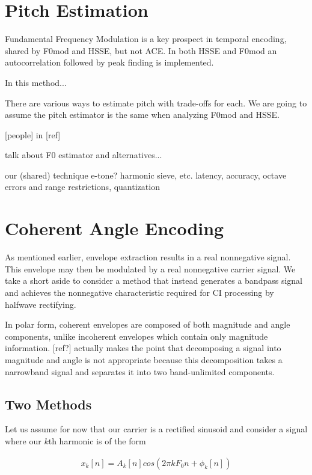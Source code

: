 \documentclass [11pt, proquest] {uwthesis}[2015/03/03]
\begin{document}
\section{Pitch Estimation}

Fundamental Frequency Modulation is a key prospect in temporal encoding, shared by F0mod and HSSE, but not ACE.  In both HSSE and F0mod an autocorrelation followed by peak finding is implemented.

In this method...

There are various ways to estimate pitch with trade-offs for each.  We are going to assume the pitch estimator is the same when analyzing F0mod and HSSE.


 [people] in [ref] 

talk about F0 estimator and alternatives...

	our (shared) technique
	e-tone? harmonic sieve, etc.
	latency, accuracy, octave errors and range restrictions,
	quantization

\section{Coherent Angle Encoding}

As mentioned earlier, envelope extraction results in a real nonnegative signal.  This envelope may then be modulated by a real nonnegative carrier signal.  We take a short aside to consider a method that instead generates a bandpass signal and achieves the nonnegative characteristic required for CI processing by halfwave rectifying.

In polar form, coherent envelopes are composed of both magnitude and angle components, unlike incoherent envelopes which contain only magnitude information.  [ref?] actually makes the point that decomposing a signal into magnitude and angle is not appropriate because this decomposition takes a narrowband signal and separates it into two band-unlimited components.

\subsection{Two Methods}

Let us assume for now that our carrier is a rectified sinusoid and consider a signal where our $k$th harmonic is of the form

\begin{align}
x_k[n] = A_k[n]cos(2\pi kF_0n + \phi_k[n])
\end{align}
\end{document}
